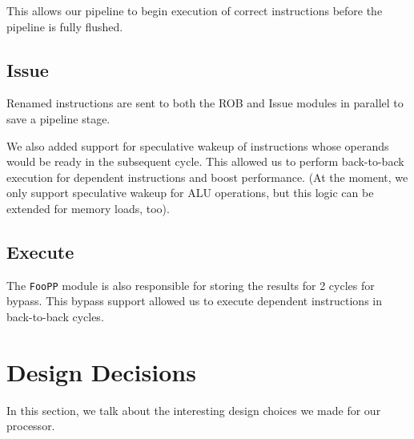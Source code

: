 \documentclass{article}
\begin{document}
This allows our pipeline to begin execution of correct instructions before the
pipeline is fully flushed.

\subsection{Issue}

Renamed instructions are sent to both the ROB and Issue modules in parallel to
save a pipeline stage.

We also added support for speculative wakeup of instructions whose operands
would be ready in the subsequent cycle. This allowed us to perform back-to-back
execution for dependent instructions and boost performance. (At the moment, we
only support speculative wakeup for ALU operations, but this logic can be
extended for memory loads, too).

\subsection{Execute}

The \texttt{FooPP} module is also responsible for storing the results for 2
cycles for bypass. This bypass support allowed us to execute dependent
instructions in back-to-back cycles.


\section{Design Decisions}
\label{sec:design-dec}
In this section, we talk about the interesting design choices we made for our
processor.
\end{document}

